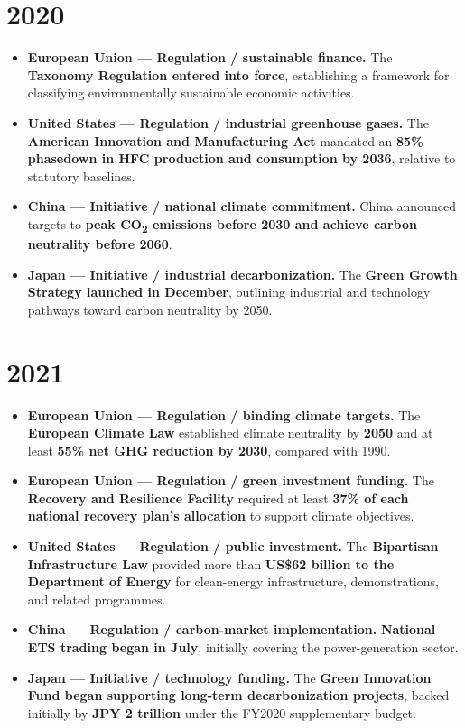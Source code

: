 \documentclass[11pt,a4paper]{article}
\newcommand{\entry}[3]{\item \textbf{#1 --- #2.} #3}
\begin{document}
\section*{2020}
\begin{itemize}
\entry{European Union}{Regulation / sustainable finance}{The \textbf{Taxonomy Regulation entered into force}, establishing a framework for classifying environmentally sustainable economic activities.\cite{taxonomy}}
\entry{United States}{Regulation / industrial greenhouse gases}{The \textbf{American Innovation and Manufacturing Act} mandated an \textbf{85\% phasedown in HFC production and consumption by 2036}, relative to statutory baselines.\cite{aim}}
\entry{China}{Initiative / national climate commitment}{China announced targets to \textbf{peak CO\textsubscript{2} emissions before 2030 and achieve carbon neutrality before 2060}.\cite{chinapledge}}
\entry{Japan}{Initiative / industrial decarbonization}{The \textbf{Green Growth Strategy launched in December}, outlining industrial and technology pathways toward carbon neutrality by 2050.\cite{japangrowth}}
\end{itemize}

\section*{2021}
\begin{itemize}
\entry{European Union}{Regulation / binding climate targets}{The \textbf{European Climate Law} established climate neutrality by \textbf{2050} and at least \textbf{55\% net GHG reduction by 2030}, compared with 1990.\cite{climatelaw}}
\entry{European Union}{Regulation / green investment funding}{The \textbf{Recovery and Resilience Facility} required at least \textbf{37\% of each national recovery plan's allocation} to support climate objectives.\cite{rrf}}
\entry{United States}{Regulation / public investment}{The \textbf{Bipartisan Infrastructure Law} provided more than \textbf{US\$62 billion to the Department of Energy} for clean-energy infrastructure, demonstrations, and related programmes.\cite{bil}}
\entry{China}{Regulation / carbon-market implementation}{\textbf{National ETS trading began in July}, initially covering the power-generation sector.\cite{china2025}}
\entry{Japan}{Initiative / technology funding}{The \textbf{Green Innovation Fund began supporting long-term decarbonization projects}, backed initially by \textbf{JPY 2 trillion} under the FY2020 supplementary budget.\cite{japanfund}}
\end{itemize}
\end{document}
